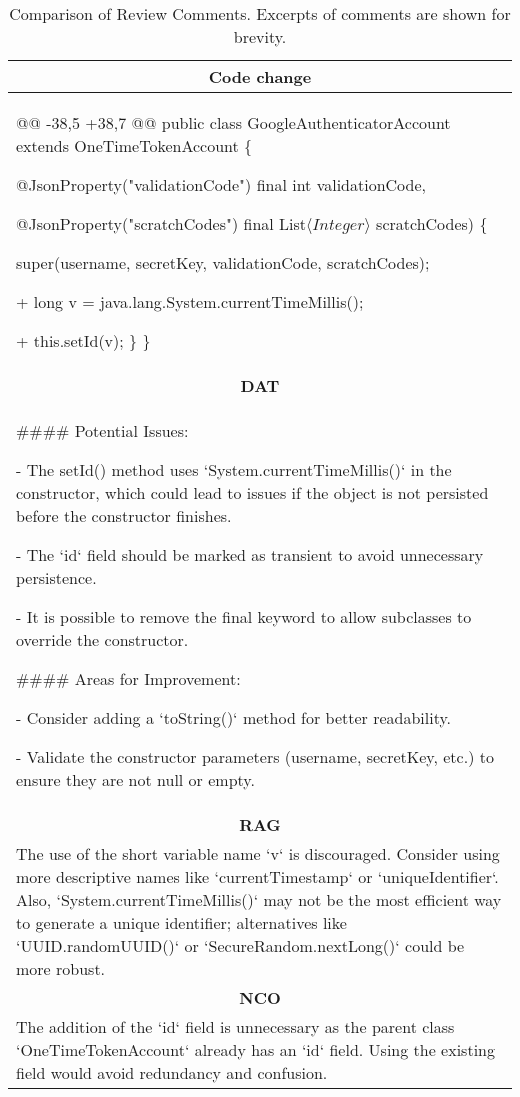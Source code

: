 \begin{table*}[!htbp]
\centering
\caption{Comparison of Review Comments. Excerpts of comments are shown for brevity.}
\label{tab:exp}
\begin{tabularx}{1\linewidth}{X}
\toprule
\multicolumn{1}{c}{\textbf{Code change}} \\
\midrule
@@ -38,5 +38,7 @@ public class GoogleAuthenticatorAccount extends OneTimeTokenAccount \{

                            @JsonProperty("validationCode") final int validationCode,
                            
                            @JsonProperty("scratchCodes") final List$\langle Integer\rangle$
                            scratchCodes) \{
                            
         super(username, secretKey, validationCode, scratchCodes);
         
+        long v =  java.lang.System.currentTimeMillis();

+        this.setId(v);
     \}
 \}
\\ \midrule
\multicolumn{1}{c}{\textbf{DAT}} \\ \midrule
\#\#\#\# Potential Issues:

- The setId() method uses `System.currentTimeMillis()` in the constructor, which could lead to issues if the object is not persisted before the constructor finishes.

- The `id` field should be marked as transient to avoid unnecessary persistence.

-  It is possible to remove the final keyword to allow subclasses to override the constructor.

\#\#\#\# Areas for Improvement:

- Consider adding a `toString()` method for better readability.

- Validate the constructor parameters (username, secretKey, etc.) to ensure they are not null or empty.
\\ \midrule
\multicolumn{1}{c}{\textbf{RAG}} \\ \midrule
The use of the short variable name `v` is discouraged. Consider using more descriptive names like `currentTimestamp` or `uniqueIdentifier`. Also, `System.currentTimeMillis()` may not be the most efficient way to generate a unique identifier; alternatives like `UUID.randomUUID()` or `SecureRandom.nextLong()` could be more robust.
\\ \midrule
\multicolumn{1}{c}{\textbf{NCO}} \\ \midrule
The addition of the `id` field is unnecessary as the parent class `OneTimeTokenAccount` already has an `id` field. Using the existing field would avoid redundancy and confusion.


\end{tabularx}
\end{table*}
